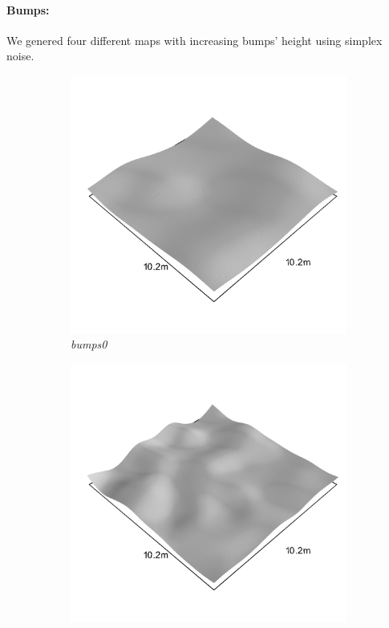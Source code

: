 \documentclass[../document.tex]{subfiles}
\begin{document}
\paragraph{Bumps:} 
We genered four different maps with increasing bumps' height using simplex noise.
\begin{figure}[htbp]
    \centering
        \begin{subfigure}[b]{0.32\textwidth}
            \includegraphics[width=\textwidth]{../img/hm3d_borders/bumps0.png}
            \caption{\emph{bumps0}}
        \end{subfigure}
        \begin{subfigure}[b]{0.32\linewidth}
            \includegraphics[width=\textwidth]{../img/hm3d_borders/bumps1.png}

\end{subfigure}
\end{figure}
\end{document}
